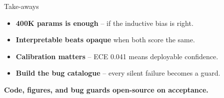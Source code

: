 \documentclass[aspectratio=169,11pt]{beamer}
\begin{document}
\begin{frame}{Take-aways}
\begin{itemize}
\item \textbf{400K params is enough} -- if the inductive bias is right.
\item \textbf{Interpretable beats opaque} when both score the same.
\item \textbf{Calibration matters} -- ECE 0.041 means deployable confidence.
\item \textbf{Build the bug catalogue} -- every silent failure becomes a guard.
\end{itemize}
\bigskip
\Large\textbf{Code, figures, and bug guards open-source on acceptance.}
\end{frame}
\end{document}
